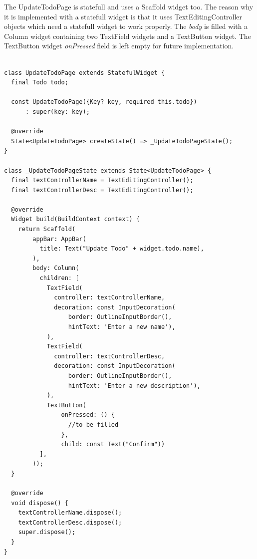The UpdateTodoPage is statefull and uses a Scaffold widget too. The reason why it is implemented with a statefull widget is that it uses TextEditingController objects which need a statefull widget to work properly. The \textit{body} is filled with a Column widget containing two TextField widgets and a TextButton widget. The TextButton widget \textit{onPressed }field is left empty for future implementation.
	\mbox{}\\
	\begin{code}
	 \mbox{}
			\label{code:2.13}
	\begin{verbatim}

class UpdateTodoPage extends StatefulWidget {
  final Todo todo;

  const UpdateTodoPage({Key? key, required this.todo})
      : super(key: key);

  @override
  State<UpdateTodoPage> createState() => _UpdateTodoPageState();
}

class _UpdateTodoPageState extends State<UpdateTodoPage> {
  final textControllerName = TextEditingController();
  final textControllerDesc = TextEditingController();

  @override
  Widget build(BuildContext context) {
    return Scaffold(
        appBar: AppBar(
          title: Text("Update Todo" + widget.todo.name),
        ),
        body: Column(
          children: [
            TextField(
              controller: textControllerName,
              decoration: const InputDecoration(
                  border: OutlineInputBorder(), 
                  hintText: 'Enter a new name'),
            ),
            TextField(
              controller: textControllerDesc,
              decoration: const InputDecoration(
                  border: OutlineInputBorder(),
                  hintText: 'Enter a new description'),
            ),
            TextButton(
                onPressed: () {
                  //to be filled
                },
                child: const Text("Confirm"))
          ],
        ));
  }

  @override
  void dispose() {
    textControllerName.dispose();
    textControllerDesc.dispose();
    super.dispose();
  }
}

	\end{verbatim}
	\end{code}

